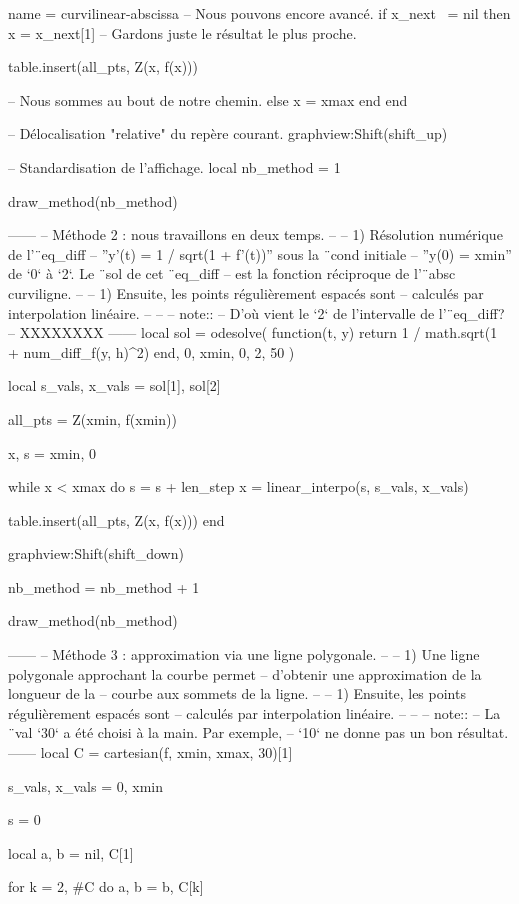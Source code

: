 \documentclass{standalone}
\begin{document}
\begin{luadraw}{name = curvilinear-abscissa}
-- Nous pouvons encore avancé.
  if x_next ~= nil then
    x = x_next[1]  -- Gardons juste le résultat le plus proche.

    table.insert(all_pts, Z(x, f(x)))

-- Nous sommes au bout de notre chemin.
  else
    x = xmax
  end
end

-- Délocalisation "relative" du repère courant.
graphview:Shift(shift_up)

-- Standardisation de l'affichage.
local nb_method = 1

draw_method(nb_method)

------
-- Méthode 2 : nous travaillons en deux temps.
--
--     1) Résolution numérique de l'¨eq_diff
--     ''y'(t) = 1 / sqrt(1 + f'(t))'' sous la ¨cond initiale
--     ''y(0) = xmin'' de `0` à `2`. Le ¨sol de cet ¨eq_diff
--     est la fonction réciproque de l'¨absc curviligne.
--
--     1) Ensuite, les points régulièrement espacés sont
--     calculés par interpolation linéaire.
--
--
-- note::
--     D'où vient le `2` de l'intervalle de l'¨eq_diff?
--     XXXXXXXX
------
local sol = odesolve(
  function(t, y)
    return 1 / math.sqrt(1 + num_diff_f(y, h)^2)
  end,
  0, xmin,
  0, 2,
  50
)

local s_vals, x_vals = sol[1], sol[2]

all_pts = {Z(xmin, f(xmin))}

x, s = xmin, 0

while x < xmax do
  s = s + len_step
  x = linear_interpo(s, s_vals, x_vals)

  table.insert(all_pts, Z(x, f(x)))
end

graphview:Shift(shift_down)

nb_method = nb_method + 1

draw_method(nb_method)

------
-- Méthode 3 : approximation via une ligne polygonale.
--
--     1) Une ligne polygonale approchant la courbe permet
--     d'obtenir une approximation de la longueur de la
--     courbe aux sommets de la ligne.
--
--     1) Ensuite, les points régulièrement espacés sont
--     calculés par interpolation linéaire.
--
--
-- note::
--     La ¨val `30` a été choisi à la main. Par exemple,
--     `10` ne donne pas un bon résultat.
------
local C = cartesian(f, xmin, xmax, 30)[1]

s_vals, x_vals = {0}, {xmin}

s = 0

local a, b = nil, C[1]

for k = 2, #C do
  a, b = b, C[k]


\end{luadraw}
\end{document}
